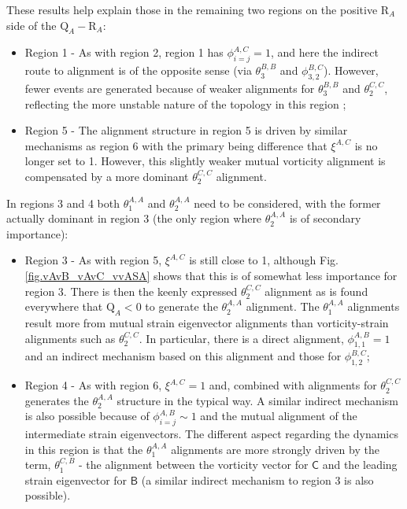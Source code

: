 \documentclass[preprint,amssymb,amsmath,aip,cha]{revtex4-1}
\begin{document}
These results help explain those in the remaining two regions on the positive $\mbox{R}_{A}$ side of the $\mbox{Q}_{A} - \mbox{R}_{A}$:
\begin{itemize}
\item Region 1 - As with region 2, region 1 has $\phi^{A,C}_{i = j} = 1$, and here the indirect route to alignment is of the opposite sense (via  $\theta^{B,B}_{3}$ and $\phi_{3,2}^{B,C}$). However, fewer events are generated because of weaker alignments for $\theta^{B,B}_{3}$ and $\theta^{C,C}_{2}$, reflecting the more unstable nature of the topology in this region \citep{chong90};
\item Region 5 - The alignment structure in region 5 is driven by similar mechanisms as region 6 with the primary being difference that $\xi^{A,C}$ is no longer set to 1. However, this slightly weaker mutual vorticity alignment is compensated by a more dominant $\theta^{C,C}_{2}$ alignment.
\end{itemize}

In regions 3 and 4 both $\theta^{A,A}_{1}$ and $\theta^{A,A}_{2}$ need to be considered, with the former actually dominant in region 3 (the only region where $\theta^{A,A}_{2}$ is of secondary importance):
\begin{itemize}
\item Region 3 - As with region 5, $\xi^{A,C}$ is still close to 1, although Fig. \ref{fig.vAvB_vAvC_vvASA} shows that this is of somewhat less importance for region 3. There is then the keenly expressed $\theta^{C,C}_{2}$ alignment as is found everywhere that  $\mbox{Q}_{A} < 0$ to generate the $\theta^{A,A}_{2}$ alignment. The $\theta^{A,A}_{1}$ alignments result more from mutual strain eigenvector alignments than vorticity-strain alignments such as $\theta^{C,C}_{2}$. In particular, there is a direct alignment, $\phi^{A,B}_{1,1} = 1$ and an indirect mechanism based on this alignment and those for $\phi^{B,C}_{1,2}$;
\item Region 4 - As with region 6, $\xi^{A,C} = 1$ and, combined with alignments for $\theta_{2}^{C,C}$ generates the $\theta^{A,A}_{2}$ structure in the typical way. A similar indirect mechanism is also possible because of $\phi^{A,B}_{i = j} \sim 1$ and the mutual alignment of the intermediate strain eigenvectors. The different aspect regarding the dynamics in this region is that the $\theta^{A,A}_{1}$ alignments are more strongly driven by the term, $\theta^{C,B}_{1}$ - the alignment between the vorticity vector for $\mathsf{C}$ and the leading strain eigenvector for $\mathsf{B}$ (a similar indirect mechanism to region 3 is also possible).
\end{itemize}
\end{document}
